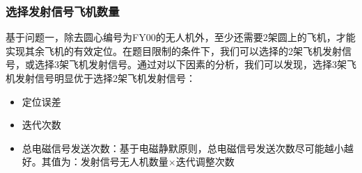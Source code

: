 \documentclass[withoutpreface,bwprint]{cumcmthesis} %
\begin{document}
			\subsubsection{选择发射信号飞机数量}
			基于问题一，除去圆心编号为FY00的无人机外，至少还需要2架圆上的飞机，才能实现其余飞机的有效定位。在题目限制的条件下，我们可以选择的2架飞机发射信号，或选择3架飞机发射信号。通过对以下因素的分析，我们可以发现，选择3架飞机发射信号明显优于选择2架飞机发射信号：
			\begin{itemize}
				\item 定位误差
				\item 迭代次数
				\item 总电磁信号发送次数：基于电磁静默原则，总电磁信号发送次数尽可能越小越好。其值为：发射信号无人机数量$\times$迭代调整次数
			\end{itemize}
			
			\subsubsection{}
\end{document}
